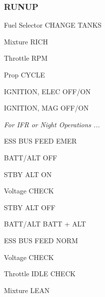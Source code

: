 \begin{multicols}{2}
\subsubsection*{RUNUP}
\begin{enumerate*}
\item Fuel Selector \dotfill CHANGE TANKS
\item Mixture \dotfill RICH
\item Throttle  RPM
\item Prop \dotfill CYCLE
\item IGNITION, ELEC \dotfill OFF/ON
\item IGNITION, MAG \dotfill OFF/ON
\item \emph{For IFR or Night Operations ...}
\begin{itemize*}
\item ESS BUS FEED \dotfill EMER
\item BATT/ALT \dotfill OFF
\item STBY ALT \dotfill ON
\item Voltage \dotfill CHECK
\item STBY ALT \dotfill OFF
\item BATT/ALT \dotfill BATT + ALT
\item ESS BUS FEED \dotfill NORM
\end{itemize*}
\item Voltage \dotfill CHECK
\item Throttle \dotfill IDLE CHECK
\item Mixture \dotfill LEAN
\end{enumerate*}

\columnbreak %


\end{multicols}
